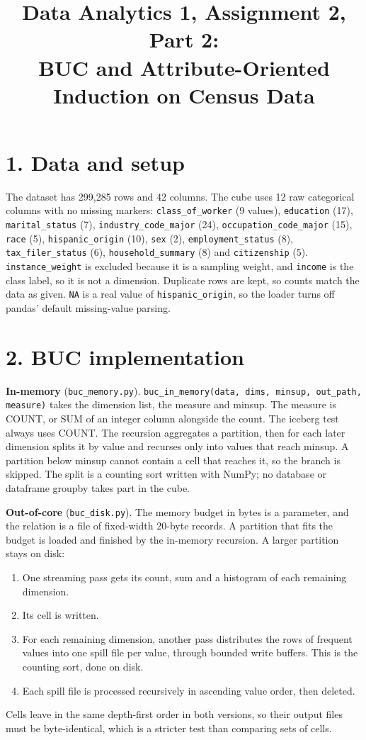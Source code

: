 \documentclass[10pt]{article}
\title{\vspace{-1.5em}Data Analytics 1, Assignment 2, Part 2:\\BUC and Attribute-Oriented Induction on Census Data}
\author{}
\date{}
\begin{document}
\maketitle
\vspace{-3em}

\section*{1. Data and setup}
The dataset has 299,285 rows and 42 columns. The cube uses 12 raw categorical columns with no missing markers: \texttt{class\_of\_worker} (9 values), \texttt{education} (17), \texttt{marital\_status} (7), \texttt{industry\_code\_major} (24), \texttt{occupation\_code\_major} (15), \texttt{race} (5), \texttt{hispanic\_origin} (10), \texttt{sex} (2), \texttt{employment\_status} (8), \texttt{tax\_filer\_status} (6), \texttt{household\_summary} (8) and \texttt{citizenship} (5).
\texttt{instance\_weight} is excluded because it is a sampling weight, and \texttt{income} is the class label, so it is not a dimension. Duplicate rows are kept, so counts match the data as given. \texttt{NA} is a real value of \texttt{hispanic\_origin}, so the loader turns off pandas' default missing-value parsing.

\section*{2. BUC implementation}
\textbf{In-memory} (\texttt{buc\_memory.py}). \texttt{buc\_in\_memory(data, dims, minsup, out\_path, measure)} takes the dimension list, the measure and minsup. The measure is COUNT, or SUM of an integer column alongside the count. The iceberg test always uses COUNT. The recursion aggregates a partition, then for each later dimension splits it by value and recurses only into values that reach minsup. A partition below minsup cannot contain a cell that reaches it, so the branch is skipped. The split is a counting sort written with NumPy; no database or dataframe groupby takes part in the cube.

\textbf{Out-of-core} (\texttt{buc\_disk.py}). The memory budget in bytes is a parameter, and the relation is a file of fixed-width 20-byte records. A partition that fits the budget is loaded and finished by the in-memory recursion. A larger partition stays on disk:
\begin{enumerate}
\item One streaming pass gets its count, sum and a histogram of each remaining dimension.
\item Its cell is written.
\item For each remaining dimension, another pass distributes the rows of frequent values into one spill file per value, through bounded write buffers. This is the counting sort, done on disk.
\item Each spill file is processed recursively in ascending value order, then deleted.
\end{enumerate}
Cells leave in the same depth-first order in both versions, so their output files must be byte-identical, which is a stricter test than comparing sets of cells.
\end{document}
